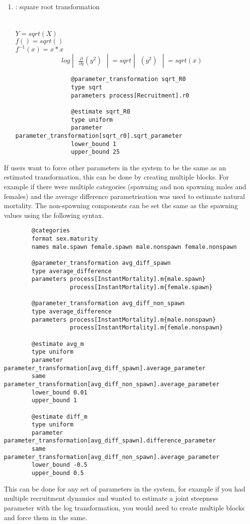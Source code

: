 \begin{enumerate}
{{\begin{verbatim}
		\end{verbatim}}}	
	\item {}  : square root transformation\\
	\\
	\\
	$Y = sqrt(X)$\\
	$f() = sqrt()$\\
	$f^{-1}(x) = x * x$
	\[
	log \begin{vmatrix} \frac{\partial}{\partial y}  (y^2) \end{vmatrix} = sqrt \begin{vmatrix}  (y^2) \end{vmatrix} = sqrt(x)
	\]
	\label{sec:Transformation-Sqrt}
	{\small{\begin{verbatim}
				@parameter_transformation sqrt_R0
				type sqrt
				parameters process[Recruitment].r0
				
				@estimate sqrt_R0
				type uniform
				parameter parameter_transformation[sqrt_r0].sqrt_parameter
				lower_bound 1
				upper_bound 25
	\end{verbatim}}}
	
	
\end{enumerate}


If users want to force other parameters in the system to be the same as an estimated transformation, this can be done by creating multiple  blocks. For example if there were multiple categories (spawning and non spawning males and females) and the average difference parametrisation was used to estimate natural mortality. The non-spawning components can be set the same as the spawning values using the following syntax.

{\small{\begin{verbatim}
		@categories
		format sex.maturity
		names male.spawn female.spawn male.nonspawn female.nonspawn
		
		@parameter_transformation avg_diff_spawn
		type average_difference
		parameters process[InstantMortality].m{male.spawn} 
		           process[InstantMortality].m{female.spawn}
		
		@parameter_transformation avg_diff_non_spawn
		type average_difference
		parameters process[InstantMortality].m{male.nonspawn} 
		           process[InstantMortality].m{female.nonspawn}
		
		@estimate avg_m
		type uniform
		parameter parameter_transformation[avg_diff_spawn].average_parameter
		same parameter_transformation[avg_diff_non_spawn].average_parameter
		lower_bound 0.01
		upper_bound 1
		
		@estimate diff_m
		type uniform
		parameter parameter_transformation[avg_diff_spawn].difference_parameter
		same parameter_transformation[avg_diff_non_spawn].average_parameter
		lower_bound -0.5
		upper_bound 0.5		
\end{verbatim}}}

This can be done for any set of parameters in the system, for example if you had multiple recruitment dynamics and wanted to estimate a joint steepness parameter with the log transformation, you would need to create multiple blocks and force them in the same.
